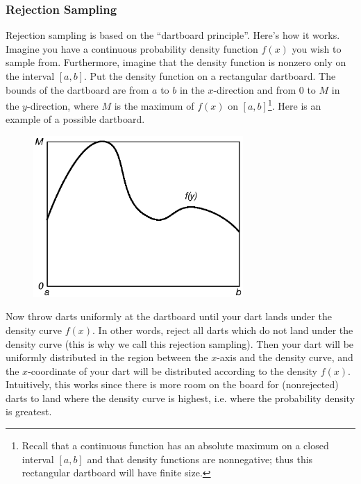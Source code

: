 \documentclass[12pt]{article}
\theoremstyle{definition}
\theoremstyle{remark}
\begin{document}
\subsubsection{Rejection Sampling}
Rejection sampling is based on the ``dartboard principle''. Here's how it works. Imagine you have a continuous probability density function $f(x)$ you wish to sample from. Furthermore, imagine that the density function is nonzero only on the interval $[a, b]$. Put the density function on a rectangular dartboard. The bounds of the dartboard are from $a$ to $b$ in the $x$-direction and from $0$ to $M$ in the $y$-direction, where $M$ is the maximum of $f(x)$ on $[a, b]$\footnote{Recall that a continuous function has an absolute maximum on a closed interval $[a, b]$ and that density functions are nonnegative; thus this rectangular dartboard will have finite size.}. Here is an example of a possible dartboard.
\begin{figure}[H]
\centering
\includegraphics[width=8cm]{rejection1}
\end{figure}
Now throw darts uniformly at the dartboard until your dart lands under the density curve $f(x)$. In other words, reject all darts which do not land under the density curve (this is why we call this rejection sampling). Then your dart will be uniformly distributed in the region between the $x$-axis and the density curve, and the $x$-coordinate of your dart will be distributed according to the density $f(x)$. Intuitively, this works since there is more room on the board for (nonrejected) darts to land where the density curve is highest, i.e. where the probability density is greatest.\\
\end{document}
